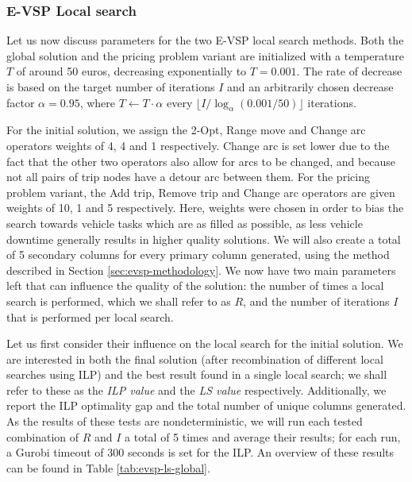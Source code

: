 \documentclass[]{article}
\begin{document}
\subsubsection{E-VSP Local search}
Let us now discuss parameters for the two E-VSP local search methods. Both the global solution and the pricing problem variant are initialized with a temperature $T$ of around 50 euros, decreasing exponentially to $T = 0.001$. The rate of decrease is based on the target number of iterations $I$ and an arbitrarily chosen decrease factor $\alpha = 0.95$, where $T \gets T \cdot \alpha$ every $\lfloor I / \log_\alpha(0.001 / 50) \rfloor$ iterations. 

For the initial solution, we assign the 2-Opt, Range move and Change arc operators weights of 4, 4 and 1 respectively. Change arc is set lower due to the fact that the other two operators also allow for arcs to be changed, and because not all pairs of trip nodes have a detour arc between them. For the pricing problem variant, the Add trip, Remove trip and Change arc operators are given weights of 10, 1 and 5 respectively. Here, weights were chosen in order to bias the search towards vehicle tasks which are as filled as possible, as less vehicle downtime generally results in higher quality solutions. We will also create a total of 5 secondary columns for every primary column generated, using the method described in Section \ref{sec:evsp-methodology}. We now have two main parameters left that can influence the quality of the solution: the number of times a local search is performed, which we shall refer to as $R$, and the number of iterations $I$ that is performed per local search. 

Let us first consider their influence on the local search for the initial solution. We are interested in both the final solution (after recombination of different local searches using ILP) and the best result found in a single local search; we shall refer to these as the \textit{ILP value} and the \textit{LS value} respectively. Additionally, we report the ILP optimality gap and the total number of unique columns generated. As the results of these tests are nondeterministic, we will run each tested combination of $R$ and $I$ a total of 5 times and average their results; for each run, a Gurobi timeout of 300 seconds is set for the ILP. An overview of these results can be found in Table \ref{tab:evsp-ls-global}.
\end{document}
